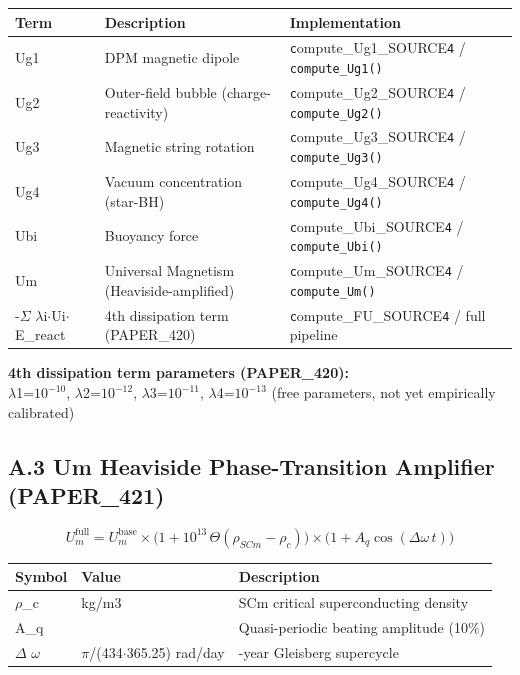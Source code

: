 \documentclass[12pt,a4paper]{article}
\begin{document}
\begin{table}[H]
\centering
\small
\begin{tabularx}{\linewidth}{@{}>{\raggedright\arraybackslash}X>{\raggedright\arraybackslash}X>{\raggedright\arraybackslash}X@{}}
\toprule
Term & Description & Implementation \tabularnewline
\midrule
Ug1 & DPM magnetic dipole & \texttt{c}ompute\_{Ug1\_SOURCE}\texttt{4} / \texttt{compute\_Ug1()} \tabularnewline
Ug2 & Outer-field bubble (charge-reactivity) & \texttt{c}ompute\_{Ug2\_SOURCE}\texttt{4} / \texttt{compute\_Ug2()} \tabularnewline
Ug3 & Magnetic string rotation & \texttt{c}ompute\_{Ug3\_SOURCE}\texttt{4} / \texttt{compute\_Ug3()} \tabularnewline
Ug4 & Vacuum concentration (star-BH) & \texttt{c}ompute\_{Ug4\_SOURCE}\texttt{4} / \texttt{compute\_Ug4()} \tabularnewline
Ubi & Buoyancy force & \texttt{c}ompute\_{Ubi\_SOURCE}\texttt{4} / \texttt{compute\_Ubi()} \tabularnewline
Um & Universal Magnetism (Heaviside-amplified) & \texttt{c}ompute\_{Um\_SOURCE}\texttt{4} / \texttt{compute\_Um()} \tabularnewline
-$\Sigma$ $\lambda$i$\cdot$Ui$\cdot$E\_react & 4th dissipation term (PAPER\_420) & \texttt{c}ompute\_{FU\_SOURCE}\texttt{4} / full pipeline \tabularnewline
\bottomrule
\end{tabularx}
\end{table}

\textbf{4th dissipation term parameters (PAPER\_420):} \\  $\lambda$1=$10^{-10}$, $\lambda$2=$10^{-12}$, $\lambda$3=$10^{-11}$, $\lambda$4=$10^{-13}$ (free parameters, not yet empirically calibrated)

\subsection{A.3 Um Heaviside Phase-Transition Amplifier (PAPER\_421)}

\begin{equation}
U_m^{\mathrm{full}} = U_m^{\mathrm{base}} \times \bigl(1 + 10^{13}\,\Theta(\rho_{SCm} - \rho_c)\bigr) \times \bigl(1 + A_q\cos(\Delta\omega\,t)\bigr)
\end{equation}

\begin{table}[H]
\centering
\small
\begin{tabularx}{\linewidth}{@{}>{\raggedright\arraybackslash}X>{\raggedright\arraybackslash}X>{\raggedright\arraybackslash}X@{}}
\toprule
Symbol & Value & Description \tabularnewline
\midrule
$\rho$\_c & 1015 kg/m3 & SCm critical superconducting density \tabularnewline
A\_q & 0.1 & Quasi-periodic beating amplitude (10\%) \tabularnewline
$\Delta$ $\omega$ & 2$\pi$/(434$\cdot$365.25) rad/day & 434-year Gleisberg supercycle \tabularnewline
\bottomrule
\end{tabularx}
\end{table}
\end{document}
